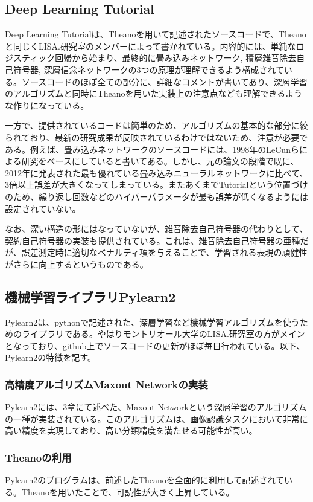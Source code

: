 \subsection{Deep Learning Tutorial}
Deep Learning Tutorialは、Theanoを用いて記述されたソースコードで、Theanoと同じくLISA.研究室のメンバーによって書かれている。内容的には、単純なロジスティック回帰から始まり、最終的に畳み込みネットワーク, 積層雑音除去自己符号器, 深層信念ネットワークの3つの原理が理解できるよう構成されている。ソースコードのほぽ全ての部分に、詳細なコメントが書いてあり、深層学習のアルゴリズムと同時にTheanoを用いた実装上の注意点なども理解できるような作りになっている。\par
一方で、提供されているコードは簡単のため、アルゴリズムの基本的な部分に絞られており、最新の研究成果が反映されているわけではないため、注意が必要である。例えば、畳み込みネットワークのソースコードには、1998年のLeCunらによる研究\cite{lecun1998gradient-based}をベースにしていると書いてある。しかし、元の論文の段階で既に、2012年に発表された最も優れている畳み込みニューラルネットワーク\cite{ciresan2012multi-column}に比べて、3倍以上誤差が大きくなってしまっている。またあくまでTutorialという位置づけのため、繰り返し回数などのハイパーパラメータが最も誤差が低くなるようには設定されていない。\par
なお、深い構造の形にはなっていないが、雑音除去自己符号器の代わりとして、契約自己符号器\cite{rifai2011contractive}\cite{rifai2011learning}の実装も提供されている。これは、雑音除去自己符号器の亜種だが、誤差測定時に適切なベナルティ項を与えることで、学習される表現の頑健性がさらに向上するというものである。

\subsection{機械学習ライブラリPylearn2}
Pylearn2は、pythonで記述された、深層学習など機械学習アルゴリズムを使うためのライブラリである\cite{goodfellow2013Pylearn2:}。やはりモントリオール大学のLISA.研究室の方がメインとなっており、github上でソースコードの更新がほぼ毎日行われている。以下、Pylearn2の特徴を記す。
\subsubsection{高精度アルゴリズムMaxout Networkの実装}
Pylearn2には、3章にて述べた、Maxout Networkという深層学習のアルゴリズムの一種が実装されている。このアルゴリズムは、画像認識タスクにおいて非常に高い精度を実現しており、高い分類精度を満たせる可能性が高い。
\subsubsection{Theanoの利用}
Pylearn2のプログラムは、前述したTheanoを全面的に利用して記述されている。Theanoを用いたことで、可読性が大きく上昇している。
